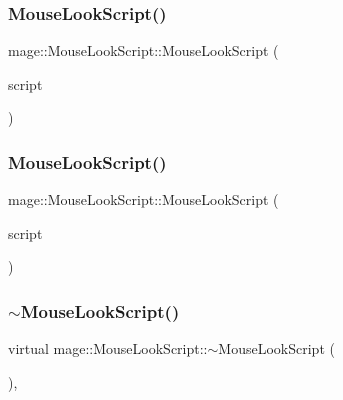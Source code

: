 \subsubsection{\texorpdfstring{Mouse\+Look\+Script()}{MouseLookScript()}\hspace{0.1cm}{\footnotesize\ttfamily [2/3]}}
{\footnotesize\ttfamily mage\+::\+Mouse\+Look\+Script\+::\+Mouse\+Look\+Script (\begin{DoxyParamCaption}\item[{const \hyperlink{classmage_1_1_mouse_look_script}{Mouse\+Look\+Script} \&}]{script }\end{DoxyParamCaption})\hspace{0.3cm}{\ttfamily [delete]}}

\hypertarget{classmage_1_1_mouse_look_script_ab922490b99932e26d27e256a71db9905}{}\label{classmage_1_1_mouse_look_script_ab922490b99932e26d27e256a71db9905} 
\subsubsection{\texorpdfstring{Mouse\+Look\+Script()}{MouseLookScript()}\hspace{0.1cm}{\footnotesize\ttfamily [3/3]}}
{\footnotesize\ttfamily mage\+::\+Mouse\+Look\+Script\+::\+Mouse\+Look\+Script (\begin{DoxyParamCaption}\item[{\hyperlink{classmage_1_1_mouse_look_script}{Mouse\+Look\+Script} \&\&}]{script }\end{DoxyParamCaption})\hspace{0.3cm}{\ttfamily [default]}}

\hypertarget{classmage_1_1_mouse_look_script_afe4592321c71e9e64a9f355b1f9cd938}{}\label{classmage_1_1_mouse_look_script_afe4592321c71e9e64a9f355b1f9cd938} 
\subsubsection{\texorpdfstring{$\sim$\+Mouse\+Look\+Script()}{~MouseLookScript()}}
{\footnotesize\ttfamily virtual mage\+::\+Mouse\+Look\+Script\+::$\sim$\+Mouse\+Look\+Script (\begin{DoxyParamCaption}{ }\end{DoxyParamCaption})\hspace{0.3cm}{\ttfamily [virtual]}, {\ttfamily [default]}}



